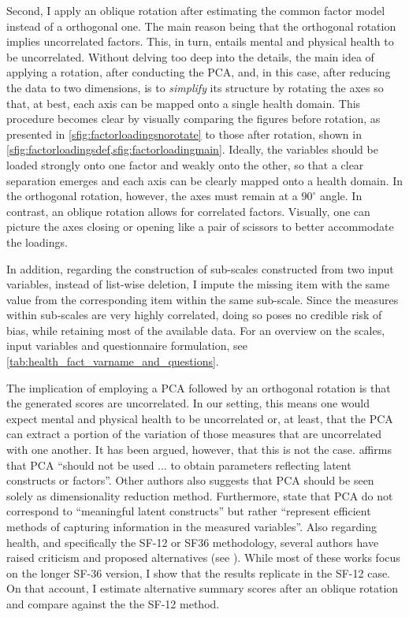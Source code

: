 Second, I apply an oblique rotation after estimating the common factor model instead of a orthogonal one. The main
reason being that the orthogonal rotation implies uncorrelated factors. This, in turn, entails mental and physical
health to be uncorrelated. Without delving too deep into the details, the main idea of applying a rotation, after
conducting the PCA, and, in this case, after reducing the data to two dimensions,  is to \textit{simplify} its
structure by rotating the axes so that, at best, each axis can be mapped onto a single health domain. This
procedure becomes clear by visually comparing the figures before rotation, as presented in
\cref{sfig:factorloadingsnorotate} to those after rotation, shown in
\cref{sfig:factorloadingsdef,sfig:factorloadingmain}. Ideally, the variables should be loaded strongly onto one
factor and weakly onto the other, so that a clear separation emerges and each axis can be clearly mapped onto a
health domain. In the orthogonal rotation, however, the axes must remain at a $90^\circ$ angle. In contrast, an
oblique rotation allows for correlated factors. Visually, one can picture the axes closing or opening like a pair
of scissors to better accommodate the loadings.

In addition, regarding the construction of sub-scales constructed from two input variables, instead of
list-wise deletion, I impute the missing item with the same value from the corresponding item within the same
sub-scale. Since the measures within sub-scales are very highly correlated, doing so poses no credible risk
of bias, while retaining most of the available data. For an overview on the scales, input variables and
questionnaire formulation, see \cref{tab:health_fact_varname_and_questions}.


The implication of employing a PCA followed by an orthogonal rotation is that the generated scores are
uncorrelated. In our setting, this means one would expect mental and physical health to be uncorrelated
or, at least, that the PCA can extract a portion of the variation of those measures that are uncorrelated with
one another.  It has been argued, however, that this is not the case. \textcite{widaman1993common} affirms that
PCA ``should not be used ... to obtain parameters reflecting latent constructs or factors''. Other authors also
suggests that PCA should be seen solely as dimensionality reduction method. Furthermore, 
\textcite[31]{fabrigar.wegener2012exploratory} state that PCA do not correspond to ``meaningful latent
constructs'' but rather ``represent efficient methods of capturing information in the measured variables''.
Also regarding health, and specifically the SF-12 or SF36 methodology, several authors have raised criticism
and proposed alternatives (see
\textcite{wilson.etal2000sf36,tucker.etal2013observed,hann2008sf36,hagell.etal2017beware}). While most of these
works focus on the longer SF-36 version, I show that the results replicate in the SF-12 case. On that account,
I estimate alternative summary scores after an oblique rotation and compare against the the SF-12 method.


